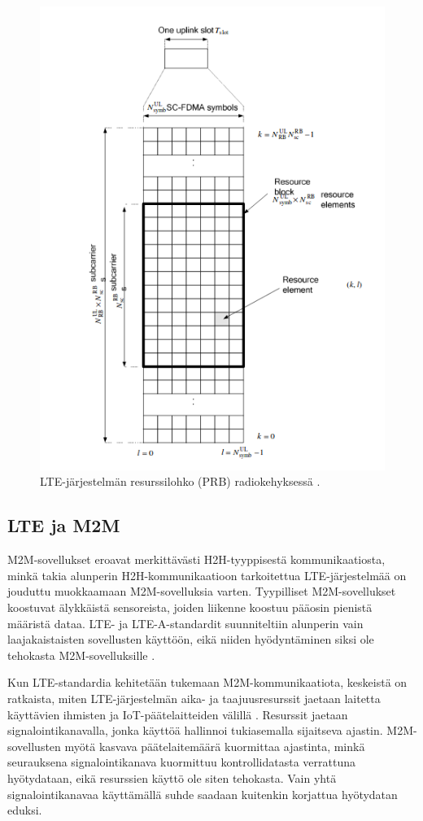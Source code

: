 \documentclass[finnish, 12pt, a4paper, elec, latin1, utf8, online]{aaltothesis}
\begin{document}
\begin{figure}[h!]
    \centering
    \includegraphics[scale=0.5]{Images/ResourceBlock.png}
    \caption{LTE-järjestelmän resurssilohko (PRB) radiokehyksessä \cite{ETSIts36211}.}
    \label{fig:PRB}
\end{figure}

\subsection{LTE ja M2M}

M2M-sovellukset eroavat merkittävästi H2H-tyyppisestä kommunikaatiosta, minkä takia alunperin H2H-kommunikaatioon tarkoitettua LTE-järjestelmää on jouduttu muokkaamaan M2M-sovelluksia varten. Tyypilliset M2M-sovellukset koostuvat älykkäistä sensoreista, joiden liikenne koostuu pääosin pienistä määristä dataa. LTE- ja LTE-A-standardit suunniteltiin alunperin vain laajakaistaisten sovellusten käyttöön, eikä niiden hyödyntäminen siksi ole tehokasta M2M-sovelluksille \cite{ghavimi2015m2m}.

Kun LTE-standardia kehitetään tukemaan M2M-kommunikaatiota, keskeistä on ratkaista, miten LTE-järjestelmän aika- ja taajuusresurssit jaetaan laitetta käyttävien ihmisten ja IoT-päätelaitteiden välillä \cite{ghavimi2015m2m}. Resurssit jaetaan signalointikanavalla, jonka käyttöä hallinnoi tukiasemalla sijaitseva ajastin. M2M-sovellusten myötä kasvava päätelaitemäärä kuormittaa ajastinta, minkä seurauksena signalointikanava kuormittuu kontrollidatasta verrattuna hyötydataan, eikä resurssien käyttö ole siten tehokasta. Vain yhtä signalointikanavaa käyttämällä suhde saadaan kuitenkin korjattua hyötydatan eduksi.
\end{document}

